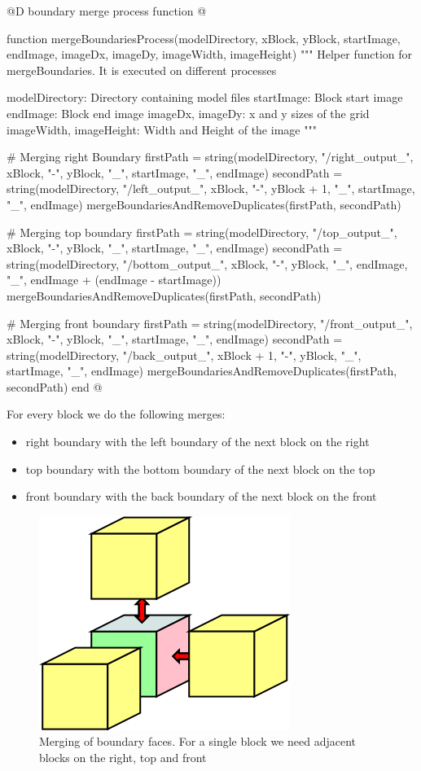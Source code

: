 \documentclass[11pt,oneside]{article}	%
\begin{document}
@D boundary merge process function
@{function mergeBoundariesProcess(modelDirectory,
				  xBlock, yBlock,
				  startImage, endImage,
				  imageDx, imageDy,
				  imageWidth, imageHeight)
  """
  Helper function for mergeBoundaries.
  It is executed on different processes

  modelDirectory: Directory containing model files
  startImage: Block start image
  endImage: Block end image
  imageDx, imageDy: x and y sizes of the grid
  imageWidth, imageHeight: Width and Height of the image
  """

  # Merging right Boundary
  firstPath = string(modelDirectory, "/right_output_", xBlock, "-", yBlock,
		    "_", startImage, "_", endImage)
  secondPath = string(modelDirectory, "/left_output_", xBlock, "-", yBlock + 1,
		    "_", startImage, "_", endImage)
  mergeBoundariesAndRemoveDuplicates(firstPath, secondPath)

  # Merging top boundary
  firstPath = string(modelDirectory, "/top_output_", xBlock, "-", yBlock,
		      "_", startImage, "_", endImage)
  secondPath = string(modelDirectory, "/bottom_output_", xBlock, "-", yBlock,
		      "_", endImage, "_", endImage + (endImage - startImage))
  mergeBoundariesAndRemoveDuplicates(firstPath, secondPath)

  # Merging front boundary
  firstPath = string(modelDirectory, "/front_output_", xBlock, "-", yBlock,
		    "_", startImage, "_", endImage)
  secondPath = string(modelDirectory, "/back_output_", xBlock + 1, "-", yBlock,
		    "_", startImage, "_", endImage)
  mergeBoundariesAndRemoveDuplicates(firstPath, secondPath)
end @}

For every block we do the following merges:
\begin{itemize}
 \item right boundary with the left boundary of the next block on the right
 \item top boundary with the bottom boundary of the next block on the top
 \item front boundary with the back boundary of the next block on the front
\end{itemize}

\begin{figure}[htb] %
   \centering
   \includegraphics[width=0.30\linewidth]{images/BoundaryMergeIteration.png}
   \caption{Merging of boundary faces. For a single block we need adjacent blocks on the right, top and front}
   \label{fig:boundaryMergeIteration}
\end{figure}
\end{document}

